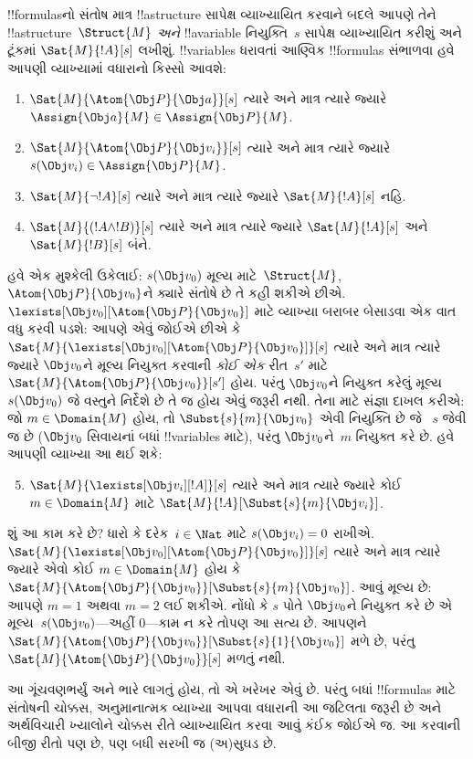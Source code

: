 \documentclass[../../../include/open-logic-section]{subfiles}
\begin{document}
!!{formula}sનો સંતોષ માત્ર !!a{structure} સાપેક્ષ વ્યાખ્યાયિત કરવાને
બદલે આપણે તેને !!a{structure}~$\Struct{M}$ \emph{અને} !!a{variable}
નિયુક્તિ~$s$ સાપેક્ષ વ્યાખ્યાયિત કરીશું અને ટૂંકમાં
$\Sat{M}{!A}[s]$ લખીશું. !!{variable}s ધરાવતાં આણ્વિક !!{formula}s
સંભાળવા હવે આપણી વ્યાખ્યામાં વધારાનો કિસ્સો આવશે:
\begin{enumerate}
  \item $\Sat{M}{\Atom{\Obj P}{\Obj a}}[s]$ ત્યારે અને માત્ર ત્યારે
  જ્યારે $\Assign{\Obj a}{M} \in \Assign{\Obj P}{M}$.
  \item $\Sat{M}{\Atom{\Obj P}{\Obj v_i}}[s]$ ત્યારે અને માત્ર ત્યારે
  જ્યારે $s(\Obj v_i) \in \Assign{\Obj P}{M}$.
  \item $\Sat{M}{\lnot !A}[s]$ ત્યારે અને માત્ર ત્યારે જ્યારે
  $\Sat{M}{!A}[s]$ નહિ.
  \item $\Sat{M}{(!A \land !B)}[s]$ ત્યારે અને માત્ર ત્યારે જ્યારે
  $\Sat{M}{!A}[s]$ અને $\Sat{M}{!B}[s]$ બંને.
\end{enumerate}
હવે એક મુશ્કેલી ઉકેલાઈ: $s(\Obj v_0)$ મૂલ્ય માટે~$\Struct{M}$,
$\Atom{\Obj P}{\Obj v_0}$ને ક્યારે સંતોષે છે તે કહી શકીએ છીએ.
$\lexists[\Obj v_0][\Atom{\Obj P}{\Obj v_0}]$ માટે વ્યાખ્યા બરાબર
બેસાડવા એક વાત વધુ કરવી પડશે: આપણે એવું જોઈએ છીએ કે
$\Sat{M}{\lexists[\Obj v_0][\Atom{\Obj P}{\Obj v_0}]}[s]$ ત્યારે અને
માત્ર ત્યારે જ્યારે $\Obj v_0$ને મૂલ્ય નિયુક્ત કરવાની \emph{કોઈ એક}
રીત~$s'$ માટે $\Sat{M}{\Atom{\Obj P}{\Obj v_0}}[s']$ હોય. પરંતુ
$\Obj v_0$ને નિયુક્ત કરેલું મૂલ્ય $s(\Obj v_0)$ જે વસ્તુને નિર્દેશે છે
તે જ હોય એવું જરૂરી નથી. તેના માટે સંજ્ઞા દાખલ કરીએ: જો $m \in
\Domain{M}$ હોય, તો $\Subst{s}{m}{\Obj v_0}$ એવી નિયુક્તિ છે જે
~$s$ જેવી જ છે ($\Obj v_0$ સિવાયનાં બધાં !!{variable}s માટે), પરંતુ
$\Obj v_0$ને~$m$ નિયુક્ત કરે છે. હવે આપણી વ્યાખ્યા આ થઈ શકે:
\begin{enumerate}\setcounter{enumi}{4}
  \item $\Sat{M}{\lexists[\Obj v_i][!A]}[s]$ ત્યારે અને માત્ર ત્યારે
  જ્યારે કોઈ~$m \in \Domain{M}$ માટે
  $\Sat{M}{!A}[\Subst{s}{m}{\Obj v_i}]$.
\end{enumerate}
શું આ કામ કરે છે? ધારો કે દરેક~$i \in \Nat$ માટે $s(\Obj v_i) = 0$
રાખીએ. $\Sat{M}{\lexists[\Obj v_0][\Atom{\Obj P}{\Obj v_0}]}[s]$
ત્યારે અને માત્ર ત્યારે જ્યારે એવો કોઈ $m \in \Domain{M}$ હોય કે
$\Sat{M}{\Atom{\Obj P}{\Obj v_0}}[\Subst{s}{m}{\Obj v_0}]$. આવું
મૂલ્ય છે: આપણે $m = 1$ અથવા $m = 2$ લઈ શકીએ. નોંધો કે $s$ પોતે
$\Obj v_0$ને નિયુક્ત કરે છે એ મૂલ્ય~$s(\Obj v_0)$---અહીં $0$---કામ ન
કરે તોપણ આ સત્ય છે. આપણને $\Sat{M}{\Atom{\Obj P}{\Obj
v_0}}[\Subst{s}{1}{\Obj v_0}]$ મળે છે, પરંતુ
$\Sat{M}{\Atom{\Obj P}{\Obj v_0}}[s]$ મળતું નથી.

આ ગૂંચવણભર્યું અને ભારે લાગતું હોય, તો એ ખરેખર એવું છે. પરંતુ બધાં
!!{formula}s માટે સંતોષની ચોક્કસ, અનુમાનાત્મક વ્યાખ્યા આપવા વધારાની આ
જટિલતા જરૂરી છે અને અર્થવિચારી ખ્યાલોને ચોક્કસ રીતે વ્યાખ્યાયિત કરવા
આવું કંઈક જોઈએ જ. આ કરવાની બીજી રીતો પણ છે, પણ બધી સરખી જ
(અ)સુઘડ છે.
\end{document}
